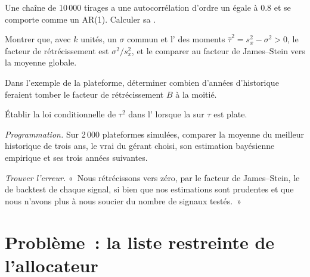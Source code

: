 \begin{exercise}[$\star$]\label{exo:qm:bayesian-methods:3}
Une chaîne de 10\,000 tirages a une autocorrélation d'ordre un égale à 0.8 et se comporte comme un AR(1). Calculer sa .
\end{exercise}

\begin{exercise}[$\star\star$]\label{exo:qm:bayesian-methods:4}
Montrer que, avec $k$ unités, un $\sigma$ commun et l' des moments $\hat\tau^2 = s_x^2 - \sigma^2 > 0$, le facteur de rétrécissement  est
$\sigma^2/s_x^2$, et le comparer au facteur de James--Stein vers la moyenne globale.
\end{exercise}

\begin{exercise}[$\star\star$]\label{exo:qm:bayesian-methods:5}
Dans l'exemple de la plateforme, déterminer combien d'années d'historique feraient tomber le facteur de rétrécissement $B$ à la moitié.
\end{exercise}

\begin{exercise}[$\star\star$]\label{exo:qm:bayesian-methods:6}
Établir la loi conditionnelle de $\tau^2$ dans l' lorsque la  sur $\tau$ est plate.
\end{exercise}

\begin{exercise}[$\star\star\star$]\label{exo:qm:bayesian-methods:7}
\emph{Programmation.} Sur 2\,000 plateformes simulées, comparer la moyenne du meilleur historique de trois ans, le vrai  du gérant choisi, son
estimation bayésienne empirique et ses trois années suivantes.
\end{exercise}

\begin{exercise}[$\star\star\star$]\label{exo:qm:bayesian-methods:8}
\emph{Trouver l'erreur.} «~Nous rétrécissons vers zéro, par le facteur de James--Stein, le  de backtest de chaque signal, si bien que nos estimations sont
prudentes et que nous n'avons plus à nous soucier du nombre de signaux testés.~»
\end{exercise}

\section{Problème~: la liste restreinte de l'allocateur}

